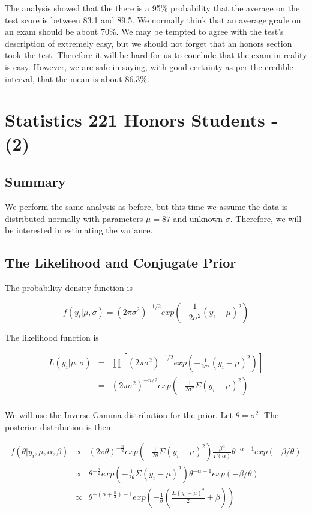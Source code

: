 \documentclass[12pt]{article}
\begin{document}
The analysis showed that the there is a 95\% probability that the average on the test score is between 83.1 and 89.5.  We normally think that an average grade on an exam should be about 70\%.  We may be tempted to agree with the test's description of extremely easy, but we should not forget that an honors section took the test.  Therefore it will be hard for us to conclude that the exam in reality is easy.  However, we are safe in saying, with good certainty as per the credible interval, that the mean is about 86.3\%.

\newpage

\section{Statistics 221 Honors Students - (2)}

\subsection{Summary}

\noindent We perform the same analysis as before, but this time we assume the data is distributed normally with parameters $\mu=87$ and unknown $\sigma$.  Therefore, we will be interested in estimating the variance.

\subsection{The Likelihood and Conjugate Prior}

\noindent The probability density function is

\[f(y_i|\mu,\sigma)=(2\pi\sigma^2)^{-1/2}exp\left(-\frac{1}{2\sigma^2}(y_i-\mu)^2\right)\]

\noindent The likelihood function is

\begin{eqnarray*}
L(y_i|\mu,\sigma) &=& \prod\left[(2\pi\sigma^2)^{-1/2}exp\left(-\frac{1}{2\sigma^2}(y_i-\mu)^2\right)\right] \\
&=& (2\pi\sigma^2)^{-n/2}exp\left(-\frac{1}{2\sigma^2}\Sigma(y_i-\mu)^2\right) \\
\end{eqnarray*}

\noindent We will use the Inverse Gamma distribution for the prior.  Let $\theta=\sigma^2$.  The posterior distribution is then

\begin{eqnarray*}
f(\theta|y_i,\mu,\alpha,\beta) &\propto& (2\pi\theta)^{-\frac{n}{2}}exp\left(-\frac{1}{2\theta}\Sigma(y_i-\mu)^2\right)\frac{\beta^\alpha}{\Gamma(\alpha)}\theta^{-\alpha-1}exp(-\beta/\theta) \\
&\propto& \theta^{-\frac{n}{2}}exp\left(-\frac{1}{2\theta}\Sigma(y_i-\mu)^2\right)\theta^{-\alpha-1}exp(-\beta/\theta) \\
&\propto& \theta^{-(\alpha+\frac{n}{2})-1}exp\left(-\frac{1}{\theta}\left(\frac{\Sigma(y_i-\mu)^2}{2}+\beta\right)\right) \\
\end{eqnarray*}
\end{document}

